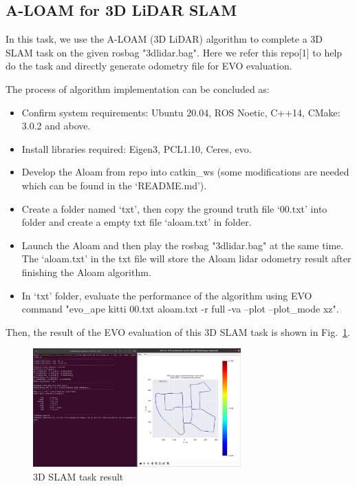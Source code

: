\documentclass[hyperref]{article}
\theoremstyle{nonumberplain}
\begin{document}
\subsection{A-LOAM for 3D LiDAR SLAM}

\hspace{1.0em}
In this task, we use the A-LOAM (3D LiDAR) algorithm to complete a 3D SLAM task on the given rosbag "3dlidar.bag". Here we refer this repo[1] to help do the task and directly generate odometry file for EVO evaluation.

The process of algorithm implementation can be concluded as:

\begin{itemize}[itemsep=3pt,topsep=0pt,parsep=0pt]
	\item[1.] Confirm system requirements: Ubuntu 20.04, ROS Noetic, C++14, CMake: 3.0.2 and above. 
	\item[2.] Install libraries required: Eigen3, PCL1.10, Ceres, evo.
	\item[3.] Develop the Aloam from repo into catkin\_ws (some modifications are needed which can be found in the ‘README.md’).
	\item[4.] Create a folder named ‘txt’, then copy the ground truth file ‘00.txt’ into folder and create a empty txt file ‘aloam.txt’ in folder.
	\item[5.] Launch the Aloam and then play the rosbag "3dlidar.bag" at the same time. The ‘aloam.txt’ in the txt file will store the Aloam lidar odometry result after finishing the Aloam algorithm.
	\item[6.] In ‘txt’ folder, evaluate the performance of the algorithm using EVO command "evo\_ape kitti 00.txt aloam.txt -r full -va --plot --plot\_mode xz".
\end{itemize}

Then, the result of the EVO evaluation of this 3D SLAM task is shown in Fig.~\ref{fig7}. 

\begin{figure}[H]
	\centering
	\includegraphics[width=8cm]{task3.1.b_result.png}
	\caption{3D SLAM task result}
	\label{fig7}
\end{figure}
\end{document}
